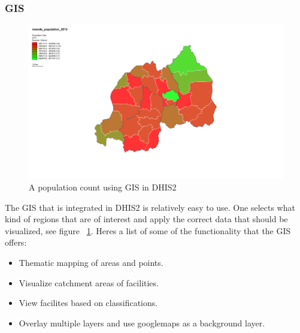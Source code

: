 \subsubsection{GIS}
\begin{figure}
\centering
\includegraphics[width=12cm]{empirical/images/map_rwanda_population_2013}
\caption{A population count using GIS in DHIS2}
\label{fig:a_population_count_using_gis_in_dhis2}
\end{figure}
The GIS that is integrated in DHIS2 is relatively easy to use. One selects what kind of regions that are of interest and apply the correct data that should be visualized, see figure ~\ref{fig:a_population_count_using_gis_in_dhis2}.
Heres a list of some of the functionality that the GIS offers:
\begin{itemize}
\item Thematic mapping of areas and points.
\item Visualize catchment areas of facilities.
\item View facilites based on classifications.
\item Overlay multiple layers and use googlemaps as a background layer.
\end{itemize}\cite{10}
